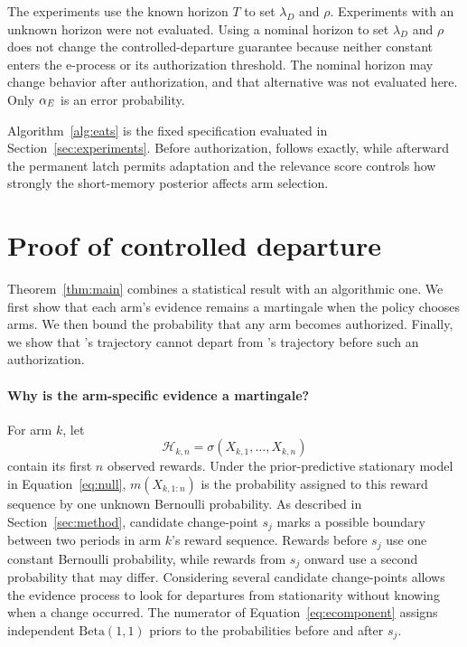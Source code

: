 The experiments use the known horizon $T$ to set $\lambda_D$ and $\rho$.
Experiments with an unknown horizon were not evaluated.
Using a nominal horizon to set $\lambda_D$ and $\rho$ does not change the controlled-departure guarantee because neither
constant enters the e-process or its authorization threshold.
The nominal horizon may change behavior after authorization, and that alternative was not evaluated here.
Only $\alpha_E$ is an error probability.

Algorithm~\ref{alg:eats} is the fixed specification evaluated in
Section~\ref{sec:experiments}.
Before authorization, \method{} follows \anchor{} exactly, while afterward the permanent latch permits adaptation and
the relevance score controls how strongly the short-memory posterior affects arm selection.

\section{Proof of controlled departure}
\label{app:proof}

Theorem~\ref{thm:main} combines a statistical result with an algorithmic one.
We first show that each arm's evidence remains a martingale when the policy chooses arms.
We then bound the probability that any arm becomes authorized.
Finally, we show that \method{}'s trajectory cannot depart from \anchor{}'s trajectory before such an authorization.

\paragraph{Why is the arm-specific evidence a martingale?}
For arm $k$, let
\[
\mathcal H_{k,n}
=
\sigma(X_{k,1},\ldots,X_{k,n})
\]
contain its first $n$ observed rewards.
Under the prior-predictive stationary model in Equation~\eqref{eq:null}, $m(X_{k,1:n})$ is the probability assigned to this reward sequence by one unknown Bernoulli probability.
As described in Section~\ref{sec:method}, candidate change-point $s_j$ marks a possible boundary between two periods in arm $k$'s reward sequence.
Rewards before $s_j$ use one constant Bernoulli probability, while rewards from $s_j$ onward use a second probability that may differ.
Considering several candidate change-points allows the evidence process to look for departures from stationarity without knowing when a change occurred.
The numerator of Equation~\eqref{eq:ecomponent} assigns independent $\mathrm{Beta}(1,1)$ priors to the probabilities before and after
$s_j$.

